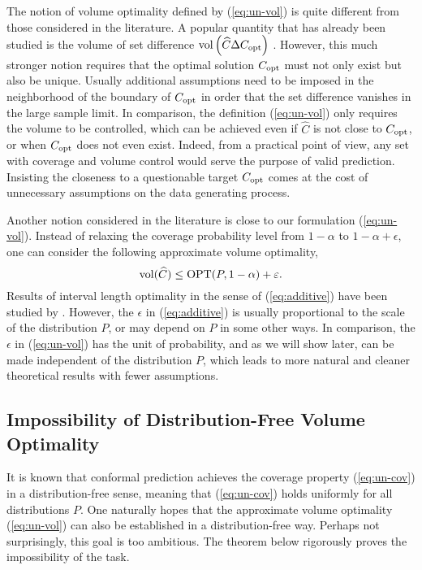 The notion of volume optimality defined by (\ref{eq:un-vol}) is quite different from those considered in the literature. A popular quantity that has already been studied is the volume of set difference $\mathrm{vol}\left(\widehat{C}\Delta C_{\rm opt}\right)$ \citep{Lei2013DistributionFreePS,izbicki2020flexible,chernozhukov2021distributional}. However, this much stronger notion requires that the optimal solution $C_{\rm opt}$ must not only exist but also be unique. Usually additional assumptions need to be imposed in the neighborhood of the boundary of $C_{\rm opt}$ in order that the set difference vanishes in the large sample limit. In comparison, the definition (\ref{eq:un-vol}) only requires the volume to be controlled, which can be achieved even if $\widehat{C}$ is not close to $C_{\rm opt}$, or when $C_{\rm opt}$ does not even exist. Indeed, from a practical point of view, any set with coverage and volume control would serve the purpose of valid prediction. Insisting the closeness to a questionable target $C_{\rm opt}$ comes at the cost of unnecessary assumptions on the data generating process.

Another notion considered in the literature is close to our formulation (\ref{eq:un-vol}). Instead of relaxing the coverage probability level from $1-\alpha$ to $1-\alpha+\epsilon$, one can consider the following approximate volume optimality,
\begin{equation}
\mathrm{vol}(\widehat{C})\leq \operatorname{OPT}(P,1-\alpha) + \varepsilon. \label{eq:additive}
\end{equation}
Results of interval length optimality in the sense of (\ref{eq:additive}) have been studied by \citep{chernozhukov2021distributional,kiyani2024length}. However, the $\epsilon$ in (\ref{eq:additive}) is usually proportional to the scale of the distribution $P$, or may depend on $P$ in some other ways. In comparison, the $\epsilon$ in (\ref{eq:un-vol}) has the unit of probability, and as we will show later, can be made independent of the distribution $P$, which leads to more natural and cleaner theoretical results with fewer assumptions.


\subsection{Impossibility of Distribution-Free Volume Optimality}

It is known that conformal prediction achieves the coverage property (\ref{eq:un-cov}) in a distribution-free sense, meaning that (\ref{eq:un-cov}) holds uniformly for all distributions $P$. One naturally hopes that the approximate volume optimality (\ref{eq:un-vol}) can also be established in a distribution-free way. Perhaps not surprisingly, this goal is too ambitious. The theorem below rigorously proves the impossibility of the task.


